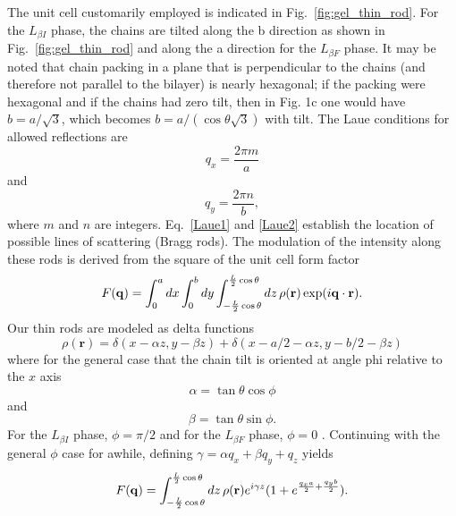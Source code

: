 The unit cell customarily employed is indicated in Fig.~\ref{fig:gel_thin_rod}.  
For the $L_{{\beta}I}$ phase, the chains 
are tilted along the \gls{b} direction 
as shown in Fig.~\ref{fig:gel_thin_rod} and along the \gls{a} direction for 
the $L_{{\beta}F}$ phase.  
It may be noted that chain packing in a plane that is perpendicular to the 
chains (and therefore not parallel to the bilayer) is nearly hexagonal; if 
the packing were hexagonal and if the chains had zero tilt, then in Fig. 1c 
one would have $b=a/\sqrt{3}$, which becomes $b=a/(\cos{\theta}\sqrt{3})$ with tilt.  
The Laue conditions for allowed reflections are 
\begin{equation}\label{Laue1}
  q_x=\frac{2 \pi m}{a}
\end{equation}
and
\begin{equation}\label{Laue2}
  q_y=\frac{2 \pi n}{b}, 
\end{equation}
where $m$ and $n$ are integers.
Eq.~\ref{Laue1} and \ref{Laue2} 
establish the location of possible lines of scattering (Bragg rods). 
The modulation of the intensity along these rods is derived from the square 
of the unit cell form factor
\begin{equation}\label{S(q)}
  F(\mathbf{q}) = \int_{0}^{a}dx\int_{0}^{b}dy
  \int_{-\frac{L}{2}\cos\theta}^{\frac{L}{2}\cos\theta}
  \mathop{dz}\rho(\mathbf{r})\exp(i\mathbf{q}\cdot\mathbf{r}).
\end{equation}
Our thin rods are modeled as delta functions
\begin{equation}\label{rods}
  \rho(\mathbf{r})=\delta(x-{\alpha}z,y-{\beta}z)+\delta(x-a/2-{\alpha}z,y-b/2-{\beta}z)
\end{equation}
where for the general case that the chain tilt is oriented at angle \gls{phi} 
relative to the $x$ axis 
\begin{equation}\label{alpha}
  \alpha=\tan{\theta}\cos{\phi}
\end{equation}
and
\begin{equation}\label{beta}
  \beta=\tan{\theta}\sin{\phi}.
\end{equation}
For the $L_{{\beta}I}$ phase, $\phi={\pi}/2$ and for the $L_{{\beta}F}$ phase, 
$\phi=0$ .  Continuing with the general $\phi$ case for awhile,
defining $\gamma = {\alpha}q_x+{\beta}q_y+q_z$ yields
\begin{equation}\label{S(q)}
  F(\mathbf{q}) = \int_{-\frac{L}{2}\cos{\theta}}^{\frac{L}{2}\cos{\theta}}\mathop{dz}
  \rho(\mathbf{r})e^{i{\gamma}z}(1+e^{\frac{q_xa}{2}+\frac{q_yb}{2}}).
\end{equation}
